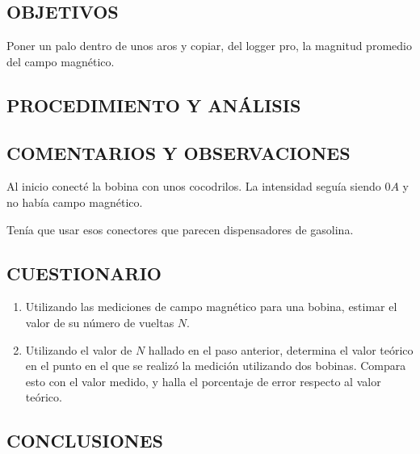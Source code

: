 \documentclass[10pt, twoside]{article}
\begin{document}
\subsection{OBJETIVOS}%

Poner un palo dentro de unos aros y copiar, del logger pro, la magnitud promedio
del campo magnético.

\subsection{PROCEDIMIENTO Y ANÁLISIS}%

\subsection{COMENTARIOS Y OBSERVACIONES}%

Al inicio conecté la bobina con unos cocodrilos.
La intensidad seguía siendo $0A$ y no había campo magnético.

Tenía que usar esos conectores que parecen dispensadores de gasolina.

\subsection{CUESTIONARIO}%
\begin{enumerate}[label=\roman*]
	\item Utilizando las mediciones de campo magnético para una bobina,
		estimar el valor de su número de vueltas $N$.
	\item Utilizando el valor de $N$ hallado en el paso anterior,
		determina el valor teórico en el punto en el que se realizó la medición
		utilizando dos bobinas.
		Compara esto con el valor medido,
		y halla el porcentaje de error respecto al valor teórico.
\end{enumerate}

\subsection{CONCLUSIONES}%
\end{document}
